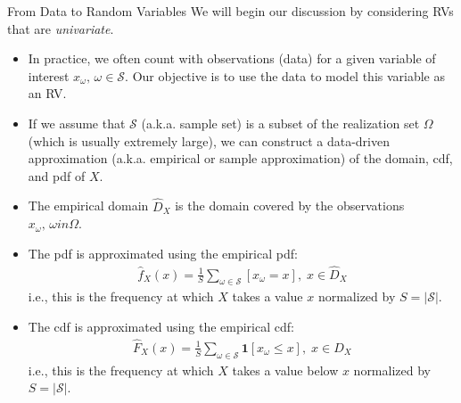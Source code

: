 \documentclass[9pt]{beamer}
\begin{document}
\begin{frame}{From Data to Random Variables}
We will begin our discussion by considering RVs that are {\em univariate}.
\begin{block}{}
\begin{itemize}
\item In practice, we often count with observations (data) for a given variable of interest $x_\omega,\, \omega \in \mathcal{S}$. Our objective is to use the data to model this variable as an RV. 
\item If we assume that $\mathcal{S}$ (a.k.a. sample set) is a subset of the realization set $\Omega$ (which is usually extremely large), we can construct a data-driven approximation (a.k.a. empirical or sample approximation) of the domain, cdf, and pdf of $X$.
\item The empirical domain $\hat{D}_X$ is the domain covered by the observations $x_\omega,\, \omega in \Omega$.
\item The pdf is approximated using the empirical pdf: 
\begin{align*}
\hat{f}_X(x)=\frac{1}{S}\sum_{\omega \in \mathcal{S}}[x_\omega= x],\; x\in \hat{D}_X
\end{align*}
i.e., this is the frequency at which $X$ takes a value $x$ normalized by $S=|\mathcal{S}|$. 
\item The cdf is approximated using the empirical cdf:
\begin{align*}
\hat{F}_X(x)=\frac{1}{S}\sum_{\omega \in \mathcal{S}}\mathbf{1}[x_\omega\leq x],\; x\in \hat{D}_X
\end{align*}
i.e., this is the frequency at which $X$ takes a value below $x$ normalized by $S=|\mathcal{S}|$. 
\end{itemize}
\end{block}
\end{frame}
\end{document}
